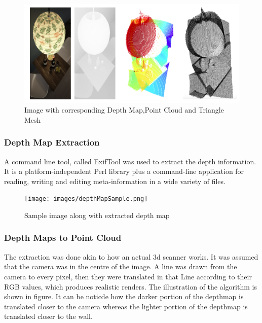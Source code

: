 \documentclass{article}
\begin{document}
    \begin{figure}[H]
        \centering
        \includegraphics[width=15cm]{images/imageDMPC.png}
        \caption{Image with corresponding Depth Map,Point Cloud and Triangle Mesh}
        \label{fig:my_label}
    \end{figure}

    
    \subsubsection{Depth Map Extraction}
    
    A command line tool, called ExifTool was used to extract the depth information. It is a platform-independent Perl library plus a command-line application for reading, writing and editing meta-information in a wide variety of files. 
    \begin{figure}[H]
        \centering
        \texttt{[image: images/depthMapSample.png]}
        \caption{Sample image along with extracted depth map}
    
    \end{figure}
    
    
    \subsubsection{Depth Maps to Point Cloud}
    
  
  The extraction was done akin to how an actual 3d scanner works. It was assumed that the camera was in the centre of the image. A line was drawn from the camera to every pixel, then they were translated in that Line according to  their RGB values, which produces realistic renders. The illustration of the algorithm is shown in figure. It can be noticde how the darker portion of the depthmap is translated closer to the camera whereas the lighter portion of the depthmap is translated closer to the wall.
  
\end{document}
